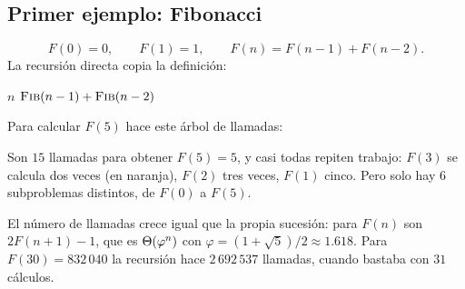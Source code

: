 \documentclass[11pt,letterpaper]{article}
\begin{document}

\subsection*{Primer ejemplo: Fibonacci}

\[
  F(0) = 0 , \qquad F(1) = 1 , \qquad F(n) = F(n-1) + F(n-2) .
\]
La recursión directa copia la definición:

\begin{algorithm}[H]
\caption{\textsc{Fib}$(n)$}
\begin{algorithmic}[1]
  \State \Return $n$
\EndIf
\State \Return $\textsc{Fib}(n-1) + \textsc{Fib}(n-2)$
\end{algorithmic}
\end{algorithm}

Para calcular $F(5)$ hace este árbol de llamadas:

\begin{center}
\end{center}

Son $15$ llamadas para obtener $F(5) = 5$, y casi todas repiten
trabajo: $F(3)$ se calcula dos veces (en naranja), $F(2)$ tres veces,
$F(1)$ cinco. Pero solo hay $6$ subproblemas distintos, de $F(0)$ a
$F(5)$.

El número de llamadas crece igual que la propia sucesión: para $F(n)$
son $2F(n+1) - 1$, que es $\Theta\!\left(\varphi^{n}\right)$ con
$\varphi = (1 + \sqrt{5})/2 \approx 1.618$. Para $F(30) = 832\,040$
la recursión hace $2\,692\,537$ llamadas, cuando bastaba con $31$
cálculos.
\end{document}
